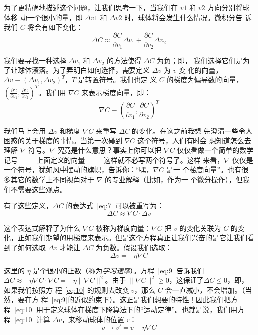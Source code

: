 为了更精确地描述这个问题，让我们思考一下，当我们在 $v1$ 和 $v2$ 方向分别将球体移
动一个很小的量，即 $\Delta v1$ 和 $\Delta v2$ 时，球体将会发生什么情况。微积分告
诉我们 $C$ 将会有如下变化：
\begin{equation}
  \Delta C \approx \frac{\partial C}{\partial v_1} \Delta v_1 +
  \frac{\partial C}{\partial v_2} \Delta v_2
  \label{eq:7}\tag{7}
\end{equation}

我们要寻找一种选择 $\Delta v_1$ 和 $\Delta v_2$ 的方法使得 $\Delta C$ 为负；即，
我们选择它们是为了让球体滚落。为了弄明白如何选择，需要定义 $\Delta v$ 为 $v$ 变
化的向量，$\Delta v \equiv (\Delta v_1, \Delta v_2)^T$，$T$ 是转置符号。我们也定
义 $C$ 的梯度为偏导数的向量，$\left(\frac{\partial C}{\partial v_1},
\frac{\partial C}{\partial v_2}\right)^T$。我们用 $\nabla C$ 来表示梯度向量，即：
\begin{equation}
  \nabla C \equiv \left( \frac{\partial C}{\partial v_1}, \frac{\partial
      C}{\partial v_2} \right)^T
  \label{eq:8}\tag{8}
\end{equation}

我们马上会用 $\Delta v$ 和梯度 $\nabla C$ 来重写 $\Delta C$ 的变化。在这之前我想
先澄清一些令人困惑的关于梯度的事情。当第一次碰到 $\nabla C$ 这个符号，人们有时会
想知道怎么去理解 $\nabla$ 符号。$\nabla$ 究竟是什么意思？事实上你可以把 $\nabla
C$ 仅仅看做一个简单的数学记号 —— 上面定义的向量 —— 这样就不必写两个符号了。这样
来看，$\nabla$ 仅仅是一个符号，犹如风中摆动的旗帜，告诉你：``嘿，$\nabla C$ 是一
个梯度向量''。也有很多其它的数学上不同视角对于 $\nabla$ 的专业解释（比如，作为一
  个微分操作），但我们不需要这些观点。

有了这些定义，$\Delta C$ 的表达式~\eqref{eq:7} 可以被重写为：
\begin{equation}
  \Delta C \approx \nabla C \cdot \Delta v
  \label{eq:9}\tag{9}
\end{equation}

这个表达式解释了为什么 $\nabla C$ 被称为梯度向量：$\nabla C$ 把 $v$ 的变化关联为
$C$ 的变化，正如我们期望的用梯度来表示。但是这个方程真正让我们兴奋的是它让我们看
到了如何选取 $\Delta v$ 才能让 $\Delta C$ 为负数。假设我们选取：
\begin{equation}
  \Delta v = -\eta \nabla C
  \label{eq:10}\tag{10}
\end{equation}

这里的 $\eta$ 是个很小的正数（称为\emph{学习速率}）。方程~\eqref{eq:9} 告诉我们
$\Delta C \approx -\eta \nabla C \cdot \nabla C = -\eta \|\nabla C\|^2$。由于
$\| \nabla C \|^2 \geq 0$，这保证了$\Delta C \leq 0$，即，如果我们按照方
程~\eqref{eq:10} 的规则去改变 $v$，那么 $C$ 会一直减小，不会增加。（当然，要在方
  程~\eqref{eq:9}的近似约束下）。这正是我们想要的特性！因此我们把方
程~\eqref{eq:10} 用于定义球体在梯度下降算法下的“运动定律”。也就是说，我们用方
程~\eqref{eq:10} 计算 $\Delta v$，来移动球体的位置 $v$：
\begin{equation}
  v \rightarrow v' = v -\eta \nabla C
  \label{eq:11}\tag{11}
\end{equation}

